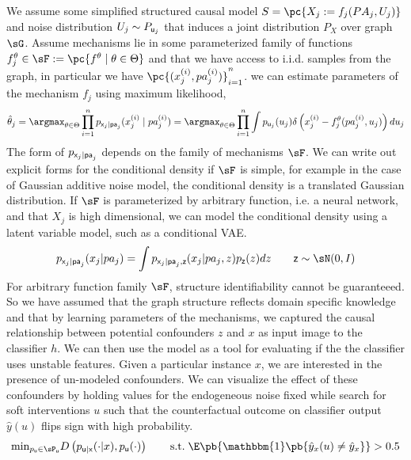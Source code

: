 \documentclass[11pt]{article}
\begin{document}
We assume some simplified structured causal model $S = \pc{X_j := f_j(PA_{j}, U_j)}$ and noise distribution $U_j\sim P_{\mathsf{u}_j}$ that induces a joint distribution $P_{X}$ over graph $\sG$. Assume mechanisms lie in some parameterized family of functions $f_j^{\theta} \in \sF := \pc{f^{\theta}\mid \theta\in\Theta}$ and that we have access to i.i.d. samples from the graph, in particular we have $\textstyle \pc{(x_j^{(i)},pa_{j}^{(i)})}_{i=1}^n$. we can estimate parameters of the mechanism $f_j$ using maximum likelihood,
\begin{align}
    \hat{\theta}_j
        = \argmax_{\theta\in\Theta} 
            \prod_{i=1}^n p_{\rx_j|\rpa_j}(x_j^{(i)} \mid pa_{j}^{(i)})
        = \argmax_{\theta\in\Theta}
            \prod_{i=1}^n \int p_{\ru_j}(u_j) \delta \left( x_j^{(i)} - f_j^{\theta}(pa_j^{(i)}, u_j) \right) du_j 
\end{align}
The form of $p_{\mathsf{x}_j\mid \mathsf{pa}_j}$ depends on the family of mechanisms $\sF$. We can write out explicit forms for the conditional density if $\sF$ is simple, for example in the case of Gaussian additive noise model, the conditional density is a translated Gaussian distribution. If $\sF$ is parameterized by arbitrary function, i.e. a neural network, and that $X_j$ is high dimensional, we can model the conditional density using a latent variable model, such as a conditional VAE.
\begin{align}
    p_{\rx_j|\rpa_j}(x_j|pa_j)
        = \int p_{\rx_j|\rpa_j,\rz}(x_j|pa_j,z) p_{\rz}(z) dz
        \qquad
        \rz \sim \sN(0,I)
\end{align}
For arbitrary function family $\sF$, structure identifiability cannot be guaranteeed. So we have assumed that the graph structure reflects domain specific knowledge and that by learning parameters of the mechanisms, we captured the causal relationship between potential confounders $z$ and $x$ as input image to the classifier $h$. We can then use the model as a tool for evaluating if the the classifier uses unstable features. Given a particular instance $x$, we are interested in the presence of un-modeled confounders. We can visualize the effect of these confounders by holding values for the endogeneous noise fixed while search for soft interventions $u$ such that the counterfactual outcome on classifier output $\hat{y}(u)$ flips sign with high probability.
\begin{align}
    \text{min}_{p_{\ru}\in \sP_{\ru}} D\left(p_{\ru|\rx}(\cdot|x),p_{\ru}(\cdot)\right)
    \qquad
    \text{s.t.}\;
    \E\pb{ \mathbbm{1}\pb{\hat{y}_{x}(u) \neq \hat{y}_x} }  > 0.5
\end{align}



 
\newpage
\printbibliography 
\end{document}

